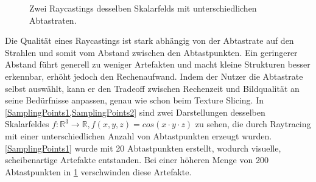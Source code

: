 \documentclass[a4paper,fontsize=12pt,toc=bib,halfparskip,ngerman]{scrartcl}
\begin{document}
\begin{figure}
\begin{minipage}{0.5\textwidth}
\begin{subfigure}{0.7\textwidth}
			\subcaption{}
			\label{SamplingPoints2}
		\end{subfigure}
	\end{minipage}
	\caption{Zwei Raycastings desselben Skalarfelds mit unterschiedlichen Abtastraten.}
	\label{SamplingPoints}
\end{figure}

Die Qualit\"at eines Raycastings ist stark abh\"angig von der Abtastrate auf den Strahlen und somit vom Abstand zwischen den Abtastpunkten. Ein geringerer Abstand f\"uhrt generell zu weniger Artefakten und macht kleine Strukturen besser erkennbar, erh\"oht jedoch den Rechenaufwand. Indem der Nutzer die Abtastrate selbst ausw\"ahlt, kann er den Tradeoff zwischen Rechenzeit und Bildqualit\"at an seine Bed\"urfnisse anpassen, genau wie schon beim Texture Slicing. In \cref{SamplingPoints1,SamplingPoints2} sind zwei Darstellungen desselben Skalarfeldes $f:\mathbb{R}^3\rightarrow\mathbb{R}, f(x, y, z)=cos(x\cdot y\cdot z)$ zu sehen, die durch Raytracing mit einer unterschiedlichen Anzahl von Abtastpunkten erzeugt wurden. \cref{SamplingPoints1} wurde mit 20 Abtastpunkten erstellt, wodurch visuelle, scheibenartige Artefakte entstanden. Bei einer h\"oheren Menge von 200 Abtastpunkten in \cref{SamplingPoints2} verschwinden diese Artefakte.
\end{document}
